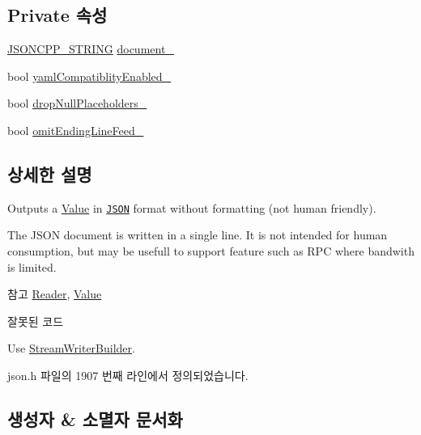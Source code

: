 \subsection*{Private 속성}
\begin{DoxyCompactItemize}
\item 
\hyperlink{json_8h_a1e723f95759de062585bc4a8fd3fa4be}{J\+S\+O\+N\+C\+P\+P\+\_\+\+S\+T\+R\+I\+NG} \hyperlink{class_json_1_1_fast_writer_a5e08c44579db8704dba1ebe37d39fdba}{document\+\_\+}
\item 
bool \hyperlink{class_json_1_1_fast_writer_a4c4c1911179bf472d24492915b0e489a}{yaml\+Compatiblity\+Enabled\+\_\+}
\item 
bool \hyperlink{class_json_1_1_fast_writer_a97e9d4ff84b59a48756dcc27a71b5904}{drop\+Null\+Placeholders\+\_\+}
\item 
bool \hyperlink{class_json_1_1_fast_writer_abd6e13851db6dcf59d84af68d48d50ac}{omit\+Ending\+Line\+Feed\+\_\+}
\end{DoxyCompactItemize}


\subsection{상세한 설명}
Outputs a \hyperlink{class_json_1_1_value}{Value} in \href{http://www.json.org}{\tt J\+S\+ON} format without formatting (not human friendly). 

The J\+S\+ON document is written in a single line. It is not intended for \textquotesingle{}human\textquotesingle{} consumption, but may be usefull to support feature such as R\+PC where bandwith is limited. \begin{DoxySeeAlso}{참고}
\hyperlink{class_json_1_1_reader}{Reader}, \hyperlink{class_json_1_1_value}{Value} 
\end{DoxySeeAlso}
\begin{DoxyRefDesc}{잘못된 코드}
\item[\hyperlink{deprecated__deprecated000008}{잘못된 코드}]Use \hyperlink{class_json_1_1_stream_writer_builder}{Stream\+Writer\+Builder}. \end{DoxyRefDesc}


json.\+h 파일의 1907 번째 라인에서 정의되었습니다.



\subsection{생성자 \& 소멸자 문서화}
\mbox{\label{class_json_1_1_fast_writer_a1bbc73ce1a1cc7b09cd1e02db3905170}} 
